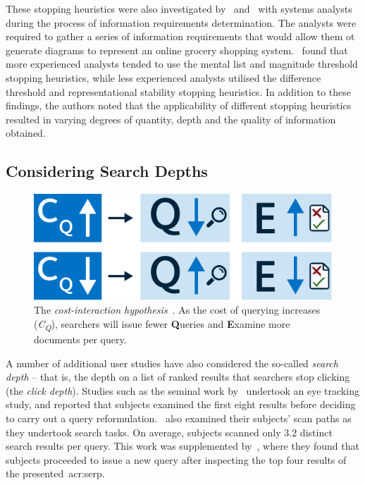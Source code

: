 These stopping heuristics were also investigated by~\cite{browne2004stopping_rules} and~\cite{pitts2004stopping_rules} with systems analysts during the process of information requirements determination. The analysts were required to gather a series of information requirements that would allow them ot generate diagrams to represent an online grocery shopping system.~\cite{browne2004stopping_rules} found that more experienced analysts tended to use the mental list and magnitude threshold stopping heuristics, while less experienced analysts utilised the difference threshold and representational stability stopping heuristics. In addition to these findings, the authors noted that the applicability of different stopping heuristics resulted in varying degrees of quantity, depth and the quality of information obtained.

\subsection{Considering Search Depths}\label{sec:stopping_background:user_studies:depths}
\begin{figure}
    \begin{center}
    \vspace*{-7mm}
    \includegraphics[width=1\textwidth]{figures/ch3-query-cost.pdf}
    \end{center}
    \vspace*{-4mm}
    \caption[The cost-interaction hypothesis]{The \emph{cost-interaction hypothesis}~\citep{azzopardi2011economics}. As the cost of querying increases (\emph{C\textsubscript{Q}}), searchers will issue fewer \textbf{Q}ueries and \textbf{E}xamine more documents per query.}
    \label{fig:query_cost}
\end{figure}

A number of additional user studies have also considered the so-called \emph{search depth} -- that is, the depth on a list of ranked results that searchers stop clicking (the \emph{click depth}). Studies such as the seminal work by~\cite{cutrell2007eye_tracking} undertook an eye tracking study, and reported that subjects examined the first eight results before deciding to carry out a query reformulation.~\cite{lorigo2008eye_tracking} also examined their subjects' scan paths as they undertook search tasks. On average, subjects scanned only $3.2$ distinct search results per query. This work was supplemented by~\cite{huang2011no_clicks}, where they found that subjects proceeded to issue a new query after inspecting the top four results of the presented~\gls{acr:serp}.

